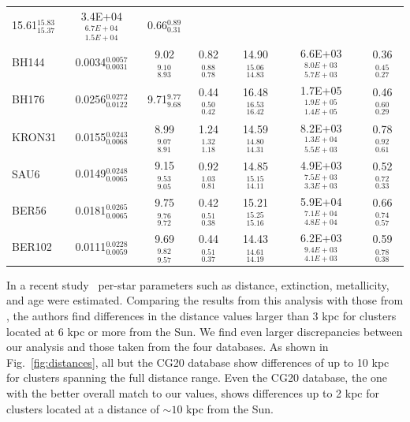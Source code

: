 \documentclass[draft]{aa}
\begin{document}
\begin{table}
\begin{tabular}{lcccccc}
  15.61$_{15.37}^{15.83}$ & 3.4E+04$_{1.5E+04}^{6.7E+04}$ & 0.66$_{0.31}^{0.89}$\\[.2cm]
  BH144 & 0.0034$_{0.0031}^{0.0057}$ & 9.02 $_{8.93}^{9.10 }$ & 0.82$_{0.78}^{0.88}$ &
  14.90$_{14.83}^{15.06}$ & 6.6E+03$_{5.7E+03}^{8.0E+03}$ & 0.36$_{0.27}^{0.45}$\\[.2cm]
  BH176 & 0.0256$_{0.0122}^{0.0272}$ & 9.71$_{9.68}^{9.77}$ & 0.44$_{0.42}^{0.50}$ &
  16.48$_{16.42}^{16.53}$ & 1.7E+05$_{1.4E+05}^{1.9E+05}$ & 0.46$_{0.29}^{0.60}$\\[.2cm]
  KRON31 & 0.0155$_{0.0068}^{0.0243}$ & 8.99 $_{8.91}^{9.07 }$ & 1.24$_{1.18}^{1.32}$ &
  14.59$_{14.31}^{14.80}$ & 8.2E+03$_{5.5E+03}^{1.3E+04}$ & 0.78$_{0.61}^{0.92}$\\[.2cm]
  SAU6 & 0.0149$_{0.0065}^{0.0248}$ & 9.15 $_{9.05}^{9.53 }$ & 0.92$_{0.81}^{1.03}$ &
  14.85$_{14.11}^{15.15}$ & 4.9E+03$_{3.3E+03}^{7.5E+03}$ & 0.52$_{0.33}^{0.72}$\\[.2cm]
  BER56 & 0.0181$_{0.0065}^{0.0265}$ & 9.75 $_{9.72}^{9.76 }$ & 0.42$_{0.38}^{0.51}$ &
  15.21$_{15.16}^{15.25}$ & 5.9E+04$_{4.8E+04}^{7.1E+04}$ & 0.66$_{0.57}^{0.74}$\\[.2cm]
  BER102 & 0.0111$_{0.0059}^{0.0228}$ & 9.69 $_{9.57}^{9.82 }$ & 0.44$_{0.37}^{0.51}$ &
  14.43$_{14.19}^{14.61}$ & 6.2E+03$_{4.1E+03}^{9.4E+03}$ & 0.59$_{0.38}^{0.78}$\\[.2cm]
  \hline
  \end{tabular}
  \end{table}

  In a recent study~\citep{Anders_2021} per-star parameters such as distance,
  extinction, metallicity, and age were estimated. Comparing the results
  from this analysis with those from \cite{Cantat_2020}, the authors find
  differences in the distance values larger than 3 kpc for clusters located at
  6 kpc or more from the Sun. We find even larger discrepancies between our
  analysis and those taken from the four databases. As shown in
  Fig.~\ref{fig:distances}, all but the CG20 database show differences of up
  to 10 kpc for clusters spanning the full distance range. Even the CG20
  database, the one with the better overall match to our values, shows
  differences up to 2 kpc for clusters located at a distance of $\sim10$ kpc
  from the Sun.\\
\end{document}
